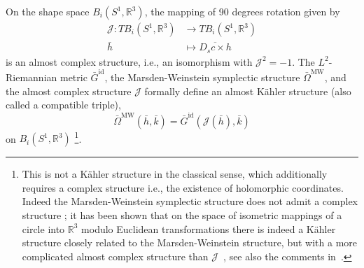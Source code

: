\documentclass[12pt]{amsart}
\newcommand{\AuthorCOMMENT}[3]{\textcolor{#2}{{[\textbf{#1:} \textsl{#3}}]}}  %
\newcommand{\cMB}[1]{\AuthorCOMMENT{Martin}{blue}{#1}}
\newcommand{\cSI}[1]{\AuthorCOMMENT{Sadashige}{violet}{#1}}
\newcommand{\Sadashige}[1]{\AuthorCOMMENT{Sadashige}{violet}{#1}}
\newcommand{\rev}[1]{#1}
\theoremstyle{definition}
\newcommand{\R}{\mathbb R}
\newcommand{\id}{\mathrm{id}}
\def\J{\mathcal{J}}
\def\R{{\mathbb R}}
\begin{document}
On the shape space $B_i(S^1,\R^3)$, the mapping of 90 degrees rotation given  by
\begin{align*}
    \J \colon TB_i(S^1,\R^3) &\to T B_i(S^1,\R^3)\\
    \rev{\bar h} &\mapsto \rev{\overline{D_s c \times h}}
\end{align*}
is an almost complex structure, i.e., an isomorphism with $\J^2=-1$. 
The $L^2$-Riemannian metric $\bar G^\id$, the Marsden-Weinstein symplectic structure $\bar\Omega^{\operatorname{MW}}$, and the almost complex structure $\J$ formally define an almost K\"ahler structure (also called a compatible triple),
\begin{equation}
\bar\Omega^{\operatorname{MW}}(\rev{\bar h,\bar k})=\bar G^{\operatorname{id}}(\J(\rev{\bar h}),\rev{\bar k})
\end{equation}
on $B_i(S^1,\R^3)$ \footnote{This is not a K\"ahler structure in the classical sense, which additionally requires a complex structure i.e., the existence of holomorphic coordinates. Indeed the Marsden-Weinstein symplectic structure does not admit a complex structure \cite{Lempert1993LoopSA}; it has been shown that on the space of isometric mappings of a circle into $\R^3$ modulo Euclidean transformations there is indeed a K\"ahler structure closely related to the Marsden-Weinstein structure, but with a more complicated almost complex structure than $\J$~\cite{Millson1996Kaehler}, see also the comments in~\cite{needham2018kahler}.}.
\end{document}

